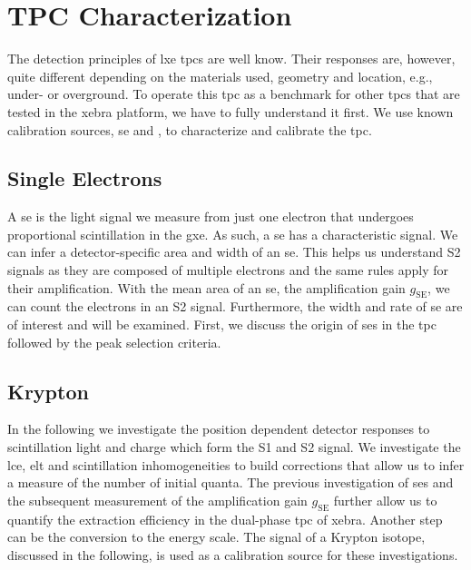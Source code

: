\FloatBarrier
\chapter{TPC Characterization}
\label{chap:Analysis}
\FloatBarrier

The detection principles of \gls{lxe} \glspl{tpc} are well know.
Their responses are, however, quite different depending on the materials used, geometry and location, e.g., under- or overground.
To operate this \gls{tpc} as a benchmark for other \glspl{tpc} that are tested in the \gls{xebra} platform, we have to fully understand it first.
We use known calibration sources, \gls{se} and , to characterize and calibrate the \gls{tpc}.

\FloatBarrier
\section{Single Electrons}
\label{sec:SE}
\FloatBarrier

A \gls{se} is the light signal we measure from just one electron that undergoes proportional scintillation in the \gls{gxe}.
As such, a \gls{se} has a characteristic signal.
We can infer a detector-specific area and width of an \gls{se}.
This helps us understand S2 signals as they are composed of multiple electrons and the same rules apply for their amplification.
With the mean area of an \gls{se}, the amplification gain $ g_\mathrm{SE} $, we can count the electrons in an S2 signal.
Furthermore, the width and rate of \gls{se} are of interest and will be examined.
First, we discuss the origin of \glspl{se} in the \gls{tpc} followed by the peak selection criteria.



\newpage

\newpage

\newpage

\newpage
% 
\newpage

\FloatBarrier
\section{Krypton}
\label{sec:Kr}
\FloatBarrier


In the following we investigate the position dependent detector responses to scintillation light and charge which form the S1 and S2 signal.
We investigate the \gls{lce}, \gls{elt} and scintillation inhomogeneities to build corrections that allow us to infer a measure of the number of initial quanta.
The previous investigation of \glspl{se} and the subsequent measurement of the amplification gain $ g_\mathrm{SE} $ further allow us to quantify the extraction efficiency in the dual-phase \gls{tpc} of \gls{xebra}.
Another step can be the conversion to the energy scale.
The signal of a Krypton isotope, discussed in the following, is used as a calibration source for these investigations.


